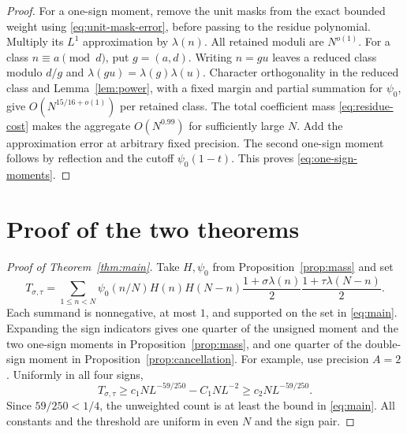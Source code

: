 \documentclass[11pt]{article}
\theoremstyle{definition}
\theoremstyle{remark}
\begin{document}
\begin{proof}
For a one-sign moment, remove the unit masks from the exact bounded
weight using \eqref{eq:unit-mask-error}, before passing to the residue
polynomial. Multiply its $L^1$ approximation by $\lambda(n)$.
All retained moduli are $N^{o(1)}$.
For a class $n\equiv a\pmod d$, put $g=(a,d)$.
Writing $n=gu$ leaves a reduced class modulo $d/g$ and
$\lambda(gu)=\lambda(g)\lambda(u)$.
Character orthogonality in the reduced class and
Lemma~\ref{lem:power}, with a fixed margin and partial summation for
$\psi_0$, give $O(N^{15/16+o(1)})$ per retained class.
The total coefficient mass \eqref{eq:residue-cost} makes the
aggregate $O(N^{0.99})$ for sufficiently large $N$.
Add the approximation error at arbitrary fixed precision.
The second one-sign moment follows by reflection and the cutoff
$\psi_0(1-t)$. This proves \eqref{eq:one-sign-moments}.
\end{proof}

\section{Proof of the two theorems}\label{sec:theorems}
\begin{proof}[Proof of Theorem~\ref{thm:main}]
Take $H,\psi_0$ from Proposition~\ref{prop:mass} and set
\begin{equation}\label{eq:signed-weight-count}
T_{\sigma,\tau}=\sum_{1\le n<N}\psi_0(n/N)H(n)H(N-n)
 \frac{1+\sigma\lambda(n)}2\frac{1+\tau\lambda(N-n)}2.
\end{equation}
Each summand is nonnegative, at most $1$, and supported on the set
in \eqref{eq:main}. Expanding the sign indicators gives one quarter
of the unsigned moment and the two one-sign moments in
Proposition~\ref{prop:mass}, and one quarter of the double-sign
moment in Proposition~\ref{prop:cancellation}.
For example, use precision $A=2$. Uniformly in all four signs,
\begin{equation}\label{eq:signed-lower}
T_{\sigma,\tau}\ge c_1NL^{-59/250}-C_1NL^{-2}
\ge c_2NL^{-59/250}.
\end{equation}
Since $59/250<1/4$, the unweighted count is at least the bound in
\eqref{eq:main}. All constants and the threshold are uniform in
even $N$ and the sign pair.
\end{proof}
\end{document}
